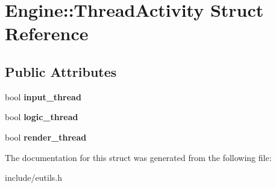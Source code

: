 \hypertarget{structEngine_1_1ThreadActivity}{}\section{Engine\+:\+:Thread\+Activity Struct Reference}
\label{structEngine_1_1ThreadActivity}
\subsection*{Public Attributes}
\begin{DoxyCompactItemize}
\item 
\hypertarget{structEngine_1_1ThreadActivity_a4aae3d046350ae22fab18eb8e13766e2}{}bool {\bfseries input\+\_\+thread}\label{structEngine_1_1ThreadActivity_a4aae3d046350ae22fab18eb8e13766e2}

\item 
\hypertarget{structEngine_1_1ThreadActivity_a299ed3f3b905abfcfd424fc188cd11da}{}bool {\bfseries logic\+\_\+thread}\label{structEngine_1_1ThreadActivity_a299ed3f3b905abfcfd424fc188cd11da}

\item 
\hypertarget{structEngine_1_1ThreadActivity_af810922a6db5e5fb295bf54a85c1171a}{}bool {\bfseries render\+\_\+thread}\label{structEngine_1_1ThreadActivity_af810922a6db5e5fb295bf54a85c1171a}

\end{DoxyCompactItemize}


The documentation for this struct was generated from the following file\+:\begin{DoxyCompactItemize}
\item 
include/eutils.\+h\end{DoxyCompactItemize}
